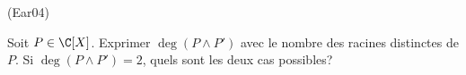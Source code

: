 \begin{tiny}(Ear04)\end{tiny} Soit $P\in \C[X]$. Exprimer $\deg(P\wedge P')$ avec le nombre des racines distinctes de $P$. Si $\deg(P\wedge P') = 2$, quels sont les deux cas possibles?
